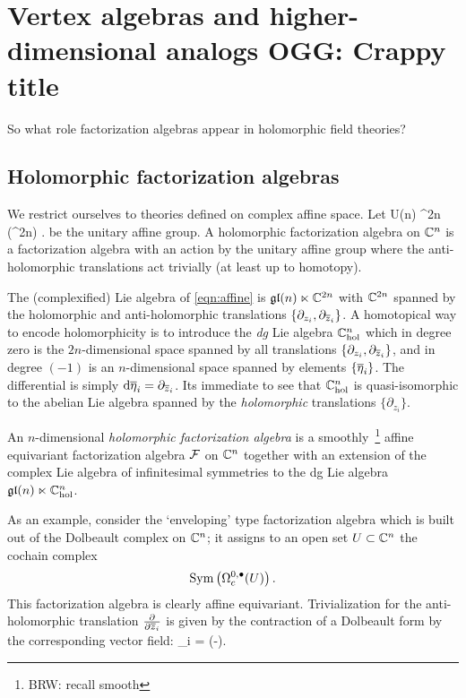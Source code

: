 \documentclass[11pt]{amsart}
\author{Owen Gwilliam and Brian R. Williams}
\date{\today}
\def\U{{\rm U}}
\def\brian#1{{\textcolor{blue!65!red}{BRW: {#1}}}}
\def\owen#1{{\textcolor{green!65!black}{OGG: {#1}}}}
\begin{document}

\section{Vertex algebras and higher-dimensional analogs \owen{Crappy title}}

So what role  factorization algebras appear in holomorphic field theories?

\subsection{Holomorphic factorization algebras}

We restrict ourselves to theories defined on complex affine space.
Let 
\beqn\label{eqn:affine}
\U(n) \ltimes \RR^{2n} (\RR^{2n}) .
\eeqn
be the unitary affine group. 
A holomorphic factorization algebra on $\CC^n$ is a factorization algebra with an action by the unitary affine group where the anti-holomorphic translations act trivially (at least up to homotopy).

The (complexified) Lie algebra of \eqref{eqn:affine} is $\mathfrak{gl}(n) \ltimes \CC^{2n}$
with $\CC^{2n}$ spanned by the holomorphic and anti-holomorphic translations $\{\partial_{z_i}, \partial_{\zbar_i}\}$. 
A homotopical way to encode holomorphicity is to introduce the {\em dg} Lie algebra $\CC^{n}_{\rm hol}$ which in degree zero is the $2n$-dimensional space spanned by all translations $\{\partial_{z_i}, \partial_{\zbar_i}\}$, and in degree $(-1)$ is an $n$-dimensional space spanned by elements $\{\Bar{\eta}_i\}$. 
The differential is simply $\d \Bar{\eta}_i = \partial_{\zbar_i}$. 
Its immediate to see that $\CC^n_{\rm hol}$ is quasi-isomorphic to the abelian Lie algebra spanned by the {\em holomorphic} translations $\{\partial_{z_i}\}$. 

\begin{dfn}
An $n$-dimensional {\em holomorphic factorization algebra} is a smoothly~\footnote{\brian{recall smooth}} affine equivariant factorization algebra $\cF$ on $\CC^n$ together with an extension of the complex Lie algebra of infinitesimal symmetries
to the dg Lie algebra $
\mathfrak{gl}(n) \ltimes \CC^{n}_{\rm hol}$. 
\end{dfn}

As an example, consider the `enveloping' type factorization algebra which is built out of the Dolbeault complex on $\CC^n$; it assigns to an open set $U \subset \CC^n$ the cochain complex
\[
{\rm Sym} \left(\Omega^{0,\bu}_c(U)\right) .
\]
This factorization algebra is clearly affine equivariant. 
Trivialization for the anti-holomorphic translation $\frac{\partial}{\partial \zbar_i}$ is given by the contraction of a Dolbeault form by the corresponding vector field:
\beqn\label{eqn:triv}
\Bar{\eta}_i =  \vee (-).
\eeqn
\end{document}
